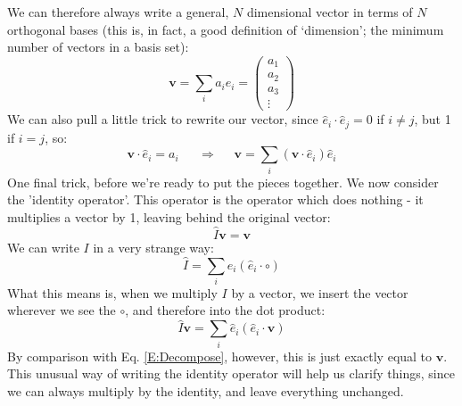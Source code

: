 \documentclass[a4paper,openany,11pt]{book}
\renewcommand\vec[1]{\boldsymbol{\mathbf{#1}}}
\begin{document}
			We can therefore always write a general, $N$ dimensional vector in terms of $N$ orthogonal bases (this is, in fact, a good definition of `dimension'; the minimum number of vectors in a basis set):
			\begin{equation}
				\vec{v} = \sum_i a_i \hat{e}_i = \begin{pmatrix}
					a_1 \\ a_2 \\ a_3 \\ \vdots
				\end{pmatrix}
			\end{equation}
			We can also pull a little trick to rewrite our vector, since $\hat{e}_i \cdot \hat{e}_j = 0$ if $i \neq j$, but 1 if $i = j$, so:
			\begin{equation}
				\vec{v} \cdot \hat{e}_i = a_i ~~~~~~~\Longrightarrow~~~~~~ \vec{v} = \sum_i (\vec{v} \cdot \hat{e}_i) \hat{e}_i \label{E:Decompose}
			\end{equation}
			One final trick, before we're ready to put the pieces together. We now consider the 'identity operator'. This operator is the operator which does nothing - it multiplies a vector by 1, leaving behind the original vector:
			\begin{equation}
				\hat{I} \vec{v} = \vec{v}
			\end{equation}
			We can write $I$ in a very strange way:
			\begin{equation}
				\hat{I} = \sum_i \hat{e}_i  \left( \hat{e}_i \cdot \circ \right)
			\end{equation}
			What this means is, when we multiply $I$ by a vector, we insert the vector wherever we see the $\circ$, and therefore into the dot product:
			\begin{equation}
				\hat{I} \vec{v} = \sum_i \hat{e}_i  (\hat{e}_i  \cdot \vec{v} )
			\end{equation}
			By comparison with Eq. \ref{E:Decompose}, however, this is just exactly equal to $\vec{v}$. This unusual way of writing the identity operator will help us clarify things, since we can always multiply by the identity, and leave everything unchanged. 
\end{document}
